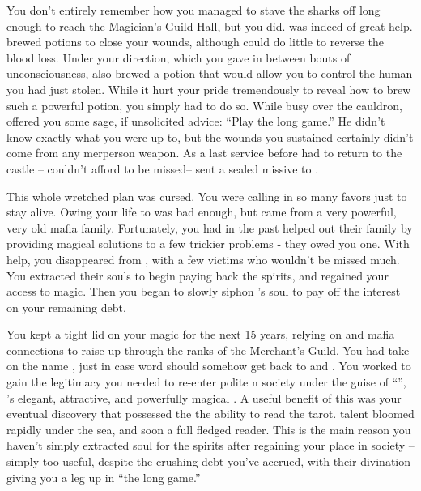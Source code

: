 \documentclass[char]{NeptuneBall}
\begin{document}
You don't entirely remember how you managed to stave the sharks off long enough to reach the Magician's Guild Hall, but you did. \cManta{} was indeed of great help. \cManta{\They} brewed potions to close your wounds, although \cManta{\they} could do little to reverse the blood loss. Under your direction, which you gave in between bouts of unconsciousness, \cManta{} also brewed a potion that would allow you to control the human \cSlave{\prince} you had just stolen. While it hurt your pride tremendously to reveal how to brew such a powerful potion, you simply had to do so. While busy over the cauldron, \cManta{} offered you some sage, if unsolicited advice: ``Play the long game.'' He didn't know exactly what you were up to, but the wounds you sustained certainly didn't come from any merperson weapon.  As a last service before \cManta{} had to return to the castle -- \cManta{\they} couldn't afford to be missed-- \cManta{} sent a sealed missive to \cPriest{}.

This whole wretched plan was cursed. You were calling in so many favors just to stay alive. Owing your life to \cManta{} was bad enough, but \cPriest{} came from a very powerful, very old mafia family. Fortunately, you had in the past helped out their family by providing magical solutions to a few trickier problems - they owed you one.  With \cPriest{\their} help, you disappeared from \pAtlantis{}, with a few victims who wouldn't be missed much. You extracted their souls to begin paying back the spirits, and regained your access to magic. Then you began to slowly siphon \cSlave{}'s soul to pay off the interest on your remaining debt.

You kept a tight lid on your magic for the next 15 years, relying on \cPriest{} and \cPriest{\their} mafia connections to raise \cSlave{} up through the ranks of the Merchant's Guild. You had \cSlave{} take on the name \cSlave{\MYname}, just in case word should somehow get back to \cAriel{} and \cEric{}. You worked to gain the legitimacy you needed to re-enter polite \pAtlantis{}n society under the guise of ``\cWitch{\MYname}'', \cSlave{}'s elegant, attractive, and powerfully magical \cWitch{\sibling}. A useful benefit of this was your eventual discovery that \cSlave{\MYname} possessed the the ability to read the tarot. \cSlave{\Their} talent bloomed rapidly under the sea, and \cSlave{\they} \cSlave{\were} soon a full fledged reader. This is the main reason you haven't simply extracted \cSlave{\their} soul for the spirits after regaining your place in society -- \cSlave{\they} \cSlave{\are} simply too useful, despite the crushing debt you've accrued, with their divination giving you a leg up in ``the long game.''
\end{document}
